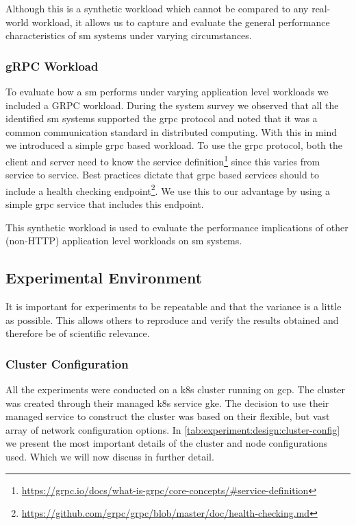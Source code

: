 Although this is a synthetic workload which cannot be compared to any real-world workload, it allows us to capture and evaluate the general performance characteristics of \gls{sm} systems under varying circumstances.

\subsubsection{gRPC Workload}
\label{sec:experiments:design:workloads:grpc}

To evaluate how a \gls{sm} performs under varying application level workloads we included a GRPC workload. During the system survey we observed that all the identified \gls{sm} systems supported the \gls{grpc} protocol and noted that it was a common communication standard in distributed computing. With this in mind we introduced a simple \gls{grpc} based workload. To use the \gls{grpc} protocol, both the client and server need to know the service definition\footnote{\url{https://grpc.io/docs/what-is-grpc/core-concepts/\#service-definition}} since this varies from service to service. Best practices dictate that \gls{grpc} based services should to include a health checking endpoint\footnote{\url{https://github.com/grpc/grpc/blob/master/doc/health-checking.md}}. We use this to our advantage by using a simple \gls{grpc} service that includes this endpoint.

This synthetic workload is used to evaluate the performance implications of other (non-HTTP) application level workloads on \gls{sm} systems.

\subsection{Experimental Environment}
\label{sec:experiments:design:environment}

It is important for experiments to be repeatable and that the variance is a little as possible. This allows others to reproduce and verify the results obtained and therefore be of scientific relevance. 

\subsubsection{Cluster Configuration}
\label{sec:experiments:design:environment:cluster}

All the experiments were conducted on a \gls{k8s} cluster running on \gls{gcp}. The cluster was created through their managed \gls{k8s} service \gls{gke}. The decision to use their managed service to construct the cluster was based on their flexible, but vast array of network configuration options. In \cref{tab:experiment:design:cluster-config} we present the most important details of the cluster and node configurations used. Which we will now discuss in further detail.

